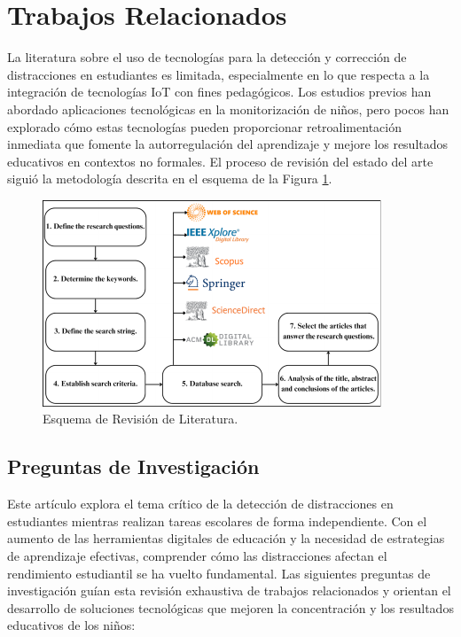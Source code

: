 \documentclass[a4paper,fleqn]{cas-sc}
\begin{document}
	\section{Trabajos Relacionados}
	\label{seccion:Tres}
		
		La literatura sobre el uso de tecnologías para la detección y corrección de distracciones en estudiantes es limitada, especialmente en lo que respecta a la integración de tecnologías IoT con fines pedagógicos. Los estudios previos han abordado aplicaciones tecnológicas en la monitorización de niños, pero pocos han explorado cómo estas tecnologías pueden proporcionar retroalimentación inmediata que fomente la autorregulación del aprendizaje y mejore los resultados educativos en contextos no formales. El proceso de revisión del estado del arte siguió la metodología descrita en el esquema de la Figura \ref{fig:LRS}.
		
		\begin{figure}[h]
			\includegraphics[width=\textwidth]{Figure_1}
			\caption{Esquema de Revisión de Literatura.}
			\label{fig:LRS}
		\end{figure}   
		
		\subsection{Preguntas de Investigación}
			Este artículo explora el tema crítico de la detección de distracciones en estudiantes mientras realizan tareas escolares de forma independiente. Con el aumento de las herramientas digitales de educación y la necesidad de estrategias de aprendizaje efectivas, comprender cómo las distracciones afectan el rendimiento estudiantil se ha vuelto fundamental. Las siguientes preguntas de investigación guían esta revisión exhaustiva de trabajos relacionados y orientan el desarrollo de soluciones tecnológicas que mejoren la concentración y los resultados educativos de los niños:
		
\end{document}
